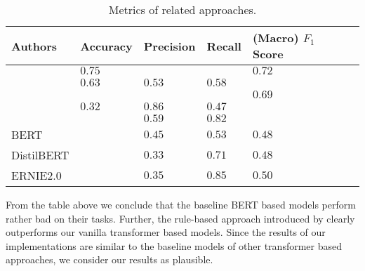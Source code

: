 \begin{table}[htpb]
    \centering
    \begin{tabular}{l | l l l l l}
        \toprule
         Authors & Accuracy& Precision & Recall & (Macro) $F_1$ Score  \\
        \midrule
        \Textcite{Xu:2019} & $0.75$ & & & $0.72$  \\
        \Textcite{Martino:2019} & $0.63$ & $0.53$ & $0.58$  \\
        \Textcite{Gao:2019} &&&& $0.69$  \\
        \Textcite{Lee:2019} & $0.32$ & $0.86$ & $0.47$  \\
        \midrule
        \Textcite{Femmer:2017} && $0.59$ &$0.82$ &  \\
        \midrule
        \ac{BERT} & & $0.45$ & $0.53$ & $0.48$ \\
        \ac{DistilBERT} & & $0.33$ & $0.71$ & $0.48$ \\
        \ac{ERNIE2.0} & & $0.35$ & $0.85$ & $0.50$\\
        \bottomrule
    \end{tabular}
    \caption[Metrics of Related Approaches]{Metrics of related approaches.}\label{tab:relation_to_existing_evidence:overview}
\end{table}

From the table above we conclude that the baseline \ac{BERT} based models perform rather bad on their tasks.
Further, the rule-based approach introduced by \textcite{Femmer:2017} clearly outperforms our vanilla transformer based models.
Since the results of our implementations are similar to the baseline models of other transformer based approaches, we consider our results as plausible.
